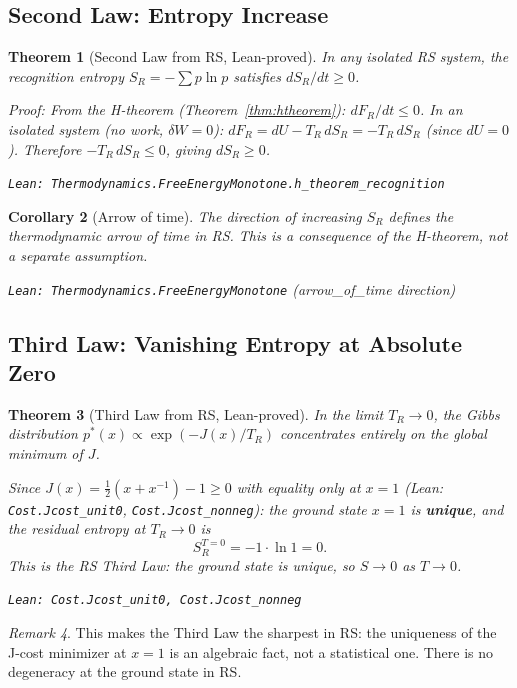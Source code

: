 \documentclass[12pt,a4paper]{article}
\newtheorem{theorem}{Theorem}[section]
\newtheorem{corollary}[theorem]{Corollary}
\theoremstyle{definition}
\theoremstyle{remark}
\newtheorem{remark}[theorem]{Remark}
\begin{document}
\subsection{Second Law: Entropy Increase}

\begin{theorem}[Second Law from RS, Lean-proved]\label{thm:second}
In any isolated RS system, the recognition entropy $S_R = -\sum p\ln p$
satisfies $dS_R/dt \geq 0$.

Proof: From the H-theorem (Theorem~\ref{thm:htheorem}): $dF_R/dt \leq 0$.
In an isolated system (no work, $\delta W = 0$): $dF_R = dU - T_R\,dS_R = -T_R\,dS_R$
(since $dU = 0$).  Therefore $-T_R\,dS_R \leq 0$, giving $dS_R \geq 0$.

\texttt{Lean: Thermodynamics.FreeEnergyMonotone.h\_theorem\_recognition}
\end{theorem}

\begin{corollary}[Arrow of time]
The direction of increasing $S_R$ defines the thermodynamic arrow of time
in RS.  This is a consequence of the H-theorem, not a separate assumption.

\texttt{Lean: Thermodynamics.FreeEnergyMonotone} (arrow\_of\_time direction)
\end{corollary}

\subsection{Third Law: Vanishing Entropy at Absolute Zero}

\begin{theorem}[Third Law from RS, Lean-proved]\label{thm:third}
In the limit $T_R \to 0$, the Gibbs distribution $p^*(x) \propto
\exp(-J(x)/T_R)$ concentrates entirely on the global minimum of $J$.

Since $J(x) = \tfrac{1}{2}(x + x^{-1}) - 1 \geq 0$ with equality
only at $x = 1$ (Lean: \texttt{Cost.Jcost\_unit0}, \texttt{Cost.Jcost\_nonneg}):
the ground state $x=1$ is \textbf{unique}, and the residual entropy
at $T_R \to 0$ is
\begin{equation}
  S_R^{T=0} = -1 \cdot \ln 1 = 0.
\end{equation}
This is the RS Third Law: the ground state is unique, so $S \to 0$ as $T \to 0$.

\texttt{Lean: Cost.Jcost\_unit0, Cost.Jcost\_nonneg}
\end{theorem}

\begin{remark}
This makes the Third Law the sharpest in RS: the uniqueness of the
J-cost minimizer at $x=1$ is an algebraic fact, not a statistical one.
There is no degeneracy at the ground state in RS.
\end{remark}
\end{document}
